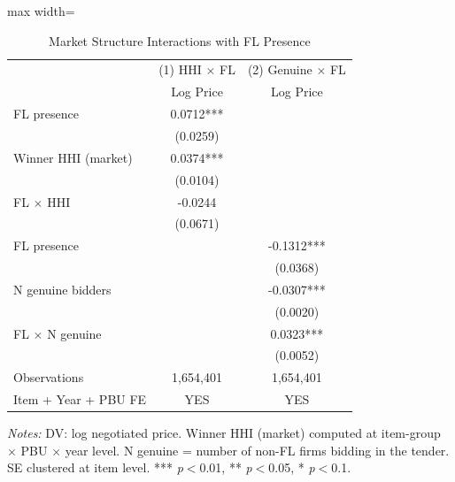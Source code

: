 \begin{table}[htbp]
\centering
\caption{Market Structure Interactions with FL Presence}
\label{tab:network_interactions}
\begin{adjustbox}{max width=\textwidth}
\begin{threeparttable}
\small
\begin{tabular}{lcc}
\toprule
 & (1) HHI $\times$ FL & (2) Genuine $\times$ FL \\
 & Log Price & Log Price \\
\midrule
FL presence & 0.0712*** & \\
 & (0.0259) & \\
Winner HHI (market) & 0.0374*** & \\
 & (0.0104) & \\
FL $\times$ HHI & -0.0244 & \\
 & (0.0671) & \\
\midrule
FL presence & & -0.1312*** \\
 & & (0.0368) \\
N genuine bidders & & -0.0307*** \\
 & & (0.0020) \\
FL $\times$ N genuine & & 0.0323*** \\
 & & (0.0052) \\
\midrule
Observations & 1,654,401 & 1,654,401 \\
Item + Year + PBU FE & YES & YES \\
\bottomrule
\end{tabular}
\begin{tablenotes}
\small
\item \textit{Notes:} DV: log negotiated price.
Winner HHI (market) computed at item-group $\times$ PBU $\times$ year level.
N genuine = number of non-FL firms bidding in the tender.
SE clustered at item level.
*** \textit{p}$<$0.01, ** \textit{p}$<$0.05, * \textit{p}$<$0.1.
\end{tablenotes}
\end{threeparttable}
\end{adjustbox}
\end{table}
